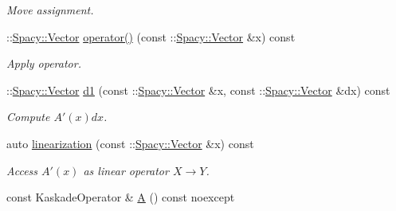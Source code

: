 \begin{DoxyCompactItemize}
\begin{DoxyCompactList}\small\item\em Move assignment. \end{DoxyCompactList}\item 
\+::\hyperlink{classSpacy_1_1Vector}{Spacy\+::\+Vector} \hyperlink{classSpacy_1_1Kaskade_1_1C1Operator_aae23a007cd7a66f90bbb1c93da34735d}{operator()} (const \+::\hyperlink{classSpacy_1_1Vector}{Spacy\+::\+Vector} \&x) const 
\begin{DoxyCompactList}\small\item\em Apply operator. \end{DoxyCompactList}\item 
\+::\hyperlink{classSpacy_1_1Vector}{Spacy\+::\+Vector} \hyperlink{classSpacy_1_1Kaskade_1_1C1Operator_a32cfd05c372cc4bc8d7e0e8aedc1e8b9}{d1} (const \+::\hyperlink{classSpacy_1_1Vector}{Spacy\+::\+Vector} \&x, const \+::\hyperlink{classSpacy_1_1Vector}{Spacy\+::\+Vector} \&dx) const 
\begin{DoxyCompactList}\small\item\em Compute $A'(x)dx$. \end{DoxyCompactList}\item 
\hypertarget{classSpacy_1_1Kaskade_1_1C1Operator_afb9837bb1c40e00b53e7430c745b1931}{}auto \hyperlink{classSpacy_1_1Kaskade_1_1C1Operator_afb9837bb1c40e00b53e7430c745b1931}{linearization} (const \+::\hyperlink{classSpacy_1_1Vector}{Spacy\+::\+Vector} \&x) const \label{classSpacy_1_1Kaskade_1_1C1Operator_afb9837bb1c40e00b53e7430c745b1931}

\begin{DoxyCompactList}\small\item\em Access $A'(x)$ as linear operator $X\rightarrow Y$. \end{DoxyCompactList}\item 
\hypertarget{classSpacy_1_1Kaskade_1_1C1Operator_ab050915a62f3f8bf25e78af1e1289cb8}{}const Kaskade\+Operator \& \hyperlink{classSpacy_1_1Kaskade_1_1C1Operator_ab050915a62f3f8bf25e78af1e1289cb8}{A} () const noexcept\label{classSpacy_1_1Kaskade_1_1C1Operator_ab050915a62f3f8bf25e78af1e1289cb8}


\end{DoxyCompactItemize}
